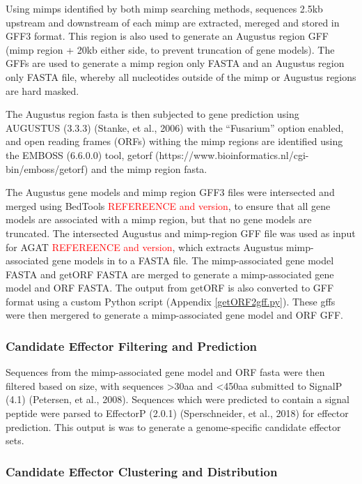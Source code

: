 Using mimps identified by both mimp searching methods, sequences 2.5kb upstream and downstream of each mimp are extracted, mereged and stored in GFF3 format. This region is also used to generate an Augustus region GFF (\ac{mimp} region + 20kb either side, to prevent truncation of gene models). The GFFs are used to generate a \ac{mimp} region only FASTA and an Augustus region only FASTA file, whereby all nucleotides outside of the \ac{mimp} or Augustus regions are hard masked.

The Augustus region fasta is then subjected to gene prediction using AUGUSTUS (3.3.3) (Stanke, et al., 2006) with the “Fusarium” option enabled, and open reading frames (ORFs) withing the mimp regions are identified using the EMBOSS (6.6.0.0) tool, getorf (https://www.bioinformatics.nl/cgi-bin/emboss/getorf) and the mimp region fasta.

The Augustus gene models and \ac{mimp} region GFF3 files were intersected and merged using BedTools \textcolor{red}{REFEREENCE and version}, to ensure that all gene models are associated with a \ac{mimp} region, but that no gene models are truncated. The intersected Augustus and \ac{mimp}-region GFF file was used as input for AGAT \textcolor{red}{REFEREENCE and version}, which extracts Augustus \ac{mimp}-associated gene models in to a FASTA file. The \ac{mimp}-associated gene model FASTA and getORF FASTA are merged to generate a \ac{mimp}-associated gene model and ORF FASTA. The output from getORF is also converted to GFF format using a custom Python script (Appendix \ref{getORF2gff.py}). These gffs were then mergered to generate a \ac{mimp}-associated gene model and ORF GFF.


\subsubsection{Candidate Effector Filtering and Prediction}

Sequences from the \ac{mimp}-associated gene model and ORF fasta were then filtered based on size, with sequences >30aa and <450aa submitted to SignalP (4.1) (Petersen, et al., 2008). Sequences which were  predicted to contain a signal peptide were parsed to EffectorP (2.0.1) (Sperschneider, et al., 2018) for effector prediction. This output is was to generate a genome-specific candidate effector sets.

\subsubsection{Candidate Effector Clustering and Distribution}

